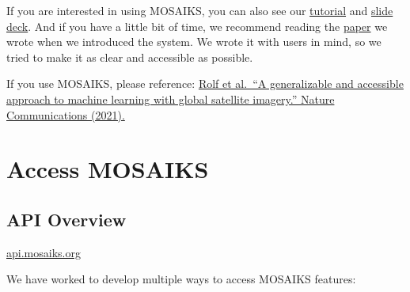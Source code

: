 \documentclass[
  letterpaper,
  DIV=11,
  numbers=noendperiod]{scrreprt}
\begin{document}
If you are interested in using MOSAIKS, you can also see our
\href{https://youtu.be/ux2c-ot3Ce0?feature=shared}{tutorial} and
\href{https://www.dropbox.com/scl/fi/m46kn8jvnab5cra5e9ebz/NBER_MOSAIKS_2021.pdf?rlkey=xsi0fyg4dksugzwcgqslz4vu2\&e=1\&dl=0}{slide
deck}. And if you have a little bit of time, we recommend reading the
\href{https://www.nature.com/articles/s41467-021-24638-z}{paper} we
wrote when we introduced the system. We wrote it with users in mind, so
we tried to make it as clear and accessible as possible.

If you use MOSAIKS, please reference:
\href{https://www.nature.com/articles/s41467-021-24638-z}{Rolf et
al.~``A generalizable and accessible approach to machine learning with
global satellite imagery.'' Nature Communications (2021).}

\hypertarget{access-mosaiks}{%
\chapter{Access MOSAIKS}\label{access-mosaiks}}

\hypertarget{api-overview}{%
\section{API Overview}\label{api-overview}}

\begin{tcolorbox}[enhanced jigsaw, bottomtitle=1mm, rightrule=.15mm, coltitle=black, titlerule=0mm, toprule=.15mm, breakable, bottomrule=.15mm, left=2mm, leftrule=.75mm, opacitybacktitle=0.6, colbacktitle=quarto-callout-tip-color!10!white, arc=.35mm, opacityback=0, title=\textcolor{quarto-callout-tip-color}{\faLightbulb}\hspace{0.5em}{MOSAIKS API Link}, toptitle=1mm, colback=white, colframe=quarto-callout-tip-color-frame]

\href{https://api.mosaiks.org/}{api.mosaiks.org}

\end{tcolorbox}

We have worked to develop multiple ways to access MOSAIKS features:
\end{document}
